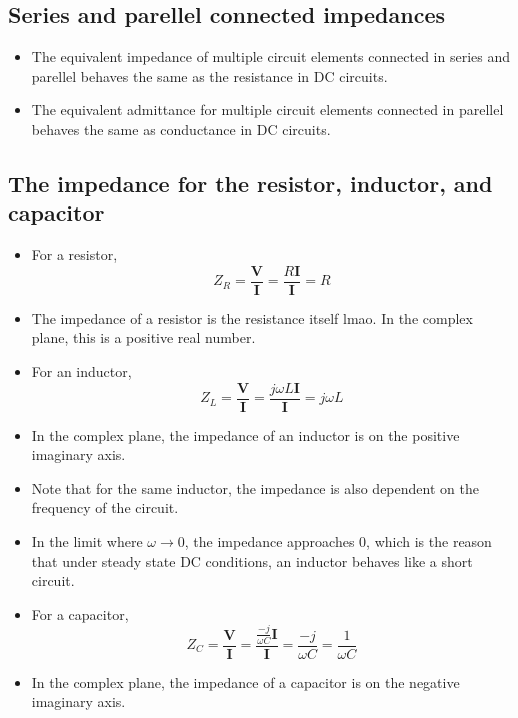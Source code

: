 \documentclass{article}
\begin{document}
\subsection{Series and parellel connected impedances}
\begin{proposition}
    \begin{itemize}
        \item The equivalent impedance of multiple circuit elements connected in series and parellel behaves the same as the resistance in DC circuits. 
        \item The equivalent admittance for multiple circuit elements connected in parellel behaves the same as conductance in DC circuits.
    \end{itemize}
\end{proposition}

\subsection{The impedance for the resistor, inductor, and capacitor}
\begin{itemize}
    \item For a resistor,
    \begin{equation}
        Z_R=\frac{\mathbf{V}}{\mathbf{I}}=\frac{R\mathbf I}{\mathbf I}=R
    \end{equation}
    \item The impedance of a resistor is the resistance itself lmao. In the complex plane, this is a positive real number.
    \item For an inductor,
    \begin{equation}
        Z_L=\frac{\mathbf V}{\mathbf I}=\frac{j\omega L\mathbf I}{\mathbf I}=j\omega L    
    \end{equation}
    \item In the complex plane, the impedance of an inductor is on the positive imaginary axis.
    \item Note that for the same inductor, the impedance is also dependent on the frequency of the circuit. 
    \item In the limit where $\omega\to 0$, the impedance approaches 0, which is the reason that under steady state DC conditions, an inductor behaves like a short circuit.
    \item For a capacitor, 
    \begin{equation}
        Z_C=\frac{\mathbf V}{\mathbf I}=\frac{\frac{-j}{\omega C}\mathbf I}{\mathbf I}=\frac{-j}{\omega C}=\frac{1}{\omega C}
    \end{equation}
    \item In the complex plane, the impedance of a capacitor is on the negative imaginary axis.
\end{itemize}
\end{document}
